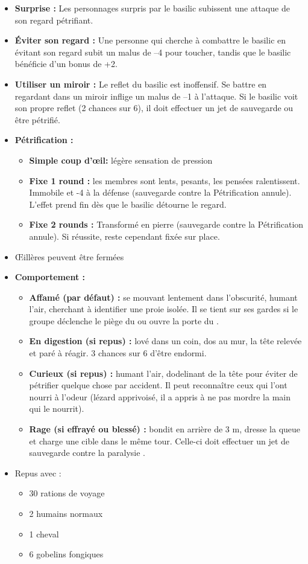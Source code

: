 \begin{itemize}
  \item \textbf{Surprise :} Les personnages surpris par le basilic subissent une attaque de son regard pétrifiant.
  \item \textbf{Éviter son regard :} Une personne qui cherche à combattre le basilic en évitant son regard subit un malus de –4 pour toucher, tandis que le basilic bénéficie d'un bonus de +2.
  \item \textbf{Utiliser un miroir :} Le reflet du basilic est inoffensif. Se battre en regardant dans un miroir inflige un malus de –1 à l'attaque. Si le basilic voit son propre reflet (2 chances sur 6), il doit effectuer un jet de sauvegarde ou être pétrifié.
  \item \textbf{Pétrification :}
  \begin{itemize}
    \item \textbf{Simple coup d'\oe il:} légère sensation de pression
    \item \textbf{Fixe 1 round :} les membres sont lents, pesants, les pensées ralentissent.
    Immobile et -4 à la défense (sauvegarde contre la Pétrification annule).
    L'effet prend fin dès que le basilic détourne le regard.
    \item \textbf{Fixe 2 rounds :} Transformé en pierre (sauvegarde contre la Pétrification annule).
    Si réussite, reste cependant fixée sur place.
  \end{itemize}
  \item \OE illères peuvent être fermées
  \item \textbf{Comportement :}
  \begin{itemize}
    \item \textbf{Affamé (par défaut) :} se mouvant lentement dans l'obscurité, humant l'air, cherchant à identifier une proie isolée.
    Il se tient sur ses gardes si le groupe déclenche le piège du \textbf{} ou ouvre la porte du \textbf{}.
    \item \textbf{En digestion (si repus) :} lové dans un coin, dos au  mur, la tête relevée et paré à réagir.
    3 chances sur 6 d'être endormi.
    \item \textbf{Curieux (si repus) :} humant l'air, dodelinant de la tête pour éviter de pétrifier quelque chose par accident.
    Il peut reconnaître ceux qui l'ont nourri à l'odeur (lézard apprivoisé, il a appris  à ne pas mordre la main qui le nourrit).
    \item \textbf{Rage (si effrayé ou blessé) :} bondit en arrière de 3 m, dresse la queue et charge une cible dans le même tour.
    Celle-ci doit effectuer un jet de sauvegarde contre la paralysie .
  \end{itemize}
  \item Repus avec :
  \begin{itemize}
    \item 30 rations de voyage
    \item 2 humains normaux
    \item 1 cheval
    \item 6 gobelins fongiques
  \end{itemize}
\end{itemize}

